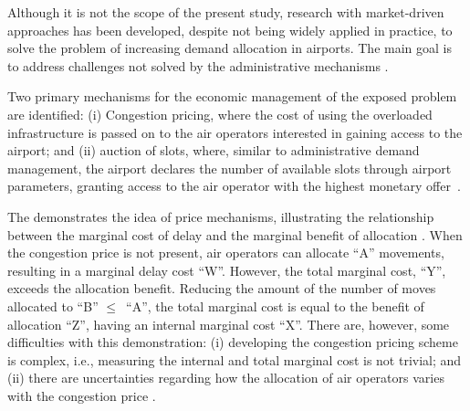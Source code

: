 Although it is not the scope of the present study, research with market-driven
approaches has been developed, despite not being widely applied
in practice, to solve the problem of increasing demand allocation in airports.
%
The main goal is to address challenges not solved by the administrative
mechanisms \cite{ball2006auctions}.


Two primary mechanisms for the economic management of the exposed problem are
identified: (i) Congestion pricing, where the cost of using the overloaded
infrastructure is passed on to the air operators interested in gaining access
to the airport; and (ii) auction of slots, where, similar to administrative
demand management, the airport declares the number of available slots through
airport parameters, granting access to the air operator with the highest
monetary offer~\cite{gillen2016airport}.






The  demonstrates the idea of price mechanisms,
illustrating the relationship between the marginal cost of delay and the
marginal benefit of allocation \cite{gillen2016airport}.
%
When the congestion price is not present, air operators can allocate
``A'' movements, resulting in a marginal delay cost ``W''.
%
However, the total marginal cost, ``Y'', exceeds the allocation benefit.
%
Reducing the amount of the number of moves allocated to ``B'' $\le$\ ``A'', the
total marginal cost is equal to the benefit of allocation ``Z'', having an
internal marginal cost ``X''.
%
There are, however, some difficulties with this demonstration: (i) developing
the congestion pricing scheme is complex, i.e., measuring the internal and 
total marginal cost is not trivial; and (ii) there are uncertainties regarding 
how the allocation of air operators varies with the congestion price 
\cite{gillen2016airport}.



%



